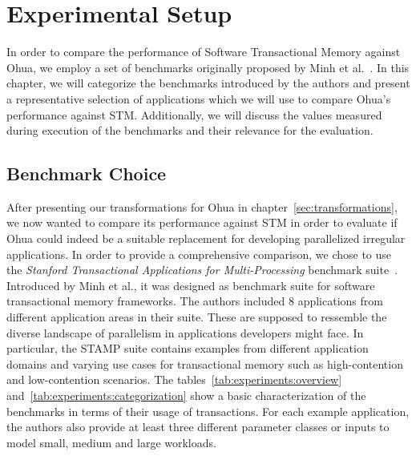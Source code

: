 %
\chapter{Experimental Setup}%
\label{sec:experiments}

In order to compare the performance of Software Transactional Memory against Ohua, we employ a set of benchmarks originally proposed by Minh et al.~\cite{minh2008stamp}.
In this chapter, we will categorize the benchmarks introduced by the authors and present a representative selection of applications which we will use to compare Ohua's performance against STM.
Additionally, we will discuss the values measured during execution of the benchmarks and their relevance for the evaluation.

\section{Benchmark Choice}

After presenting our transformations for Ohua in chapter~\ref{sec:transformations}, we now wanted to compare its performance against STM in order to evaluate if Ohua could indeed be a suitable replacement for developing parallelized irregular applications.
In order to provide a comprehensive comparison, we chose to use the \emph{Stanford Transactional Applications for Multi-Processing} benchmark suite~\cite{minh2008stamp}.
Introduced by Minh et al., it was designed as benchmark suite for software transactional memory frameworks.
The authors included 8 applications from different application areas in their suite.
These are supposed to ressemble the diverse landscape of parallelism in applications developers might face.
In particular, the STAMP suite contains examples from different application domains and varying use cases for transactional memory such as high-contention and low-contention scenarios.
The tables~\ref{tab:experiments:overview} and~\ref{tab:experiments:categorization} show a basic characterization of the benchmarks in terms of their usage of transactions.
For each example application, the authors also provide at least three different parameter classes or inputs to model small, medium and large workloads.

